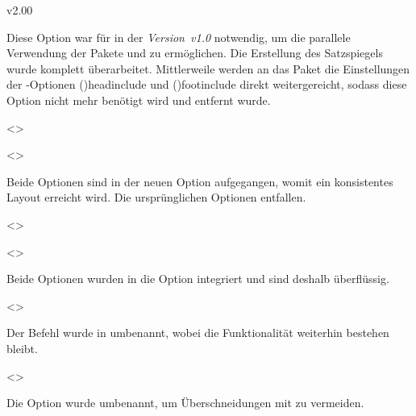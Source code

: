 \begin{Cessations}{v2.00}
\begin{Cessation}
Diese Option war für \TUDScript in der \emph{Version~v1.0} notwendig, um die 
parallele Verwendung der Pakete  und  zu 
ermöglichen. Die Erstellung des Satzspiegels wurde komplett überarbeitet. 
Mittlerweile werden an das Paket  die Einstellungen der 
\KOMAScript-Optionen \Option*(){headinclude} und 
\Option*(){footinclude} direkt 
weitergereicht, sodass diese Option nicht mehr benötigt wird und entfernt wurde.
\end{Cessation}

\begin{Cessation}
  {}
  <>
\begin{Cessation}
  {}
  <>
\printdeclarationlist

Beide Optionen sind in der neuen Option  
aufgegangen, womit ein konsistentes Layout erreicht wird. Die ursprünglichen 
Optionen entfallen. 
\end{Cessation}
\end{Cessation}

\begin{Cessation}
  {}
  <>
\begin{Cessation}
  {}
  <>
\printdeclarationlist

Beide Optionen wurden in die Option  integriert und sind 
deshalb überflüssig.
\end{Cessation}
\end{Cessation}

\begin{Cessation}
  {}
  <>
\printdeclarationlist

Der Befehl wurde in  umbenannt, wobei die Funktionalität 
weiterhin bestehen bleibt.
\end{Cessation}

\begin{Cessation}
  {}
  <>
\printdeclarationlist

Die Option wurde umbenannt, um Überschneidungen mit  zu 
vermeiden.
\end{Cessation}

\begin{Cessation}
  {}
\printdeclarationlist


\end{Cessation}
\end{Cessations}
